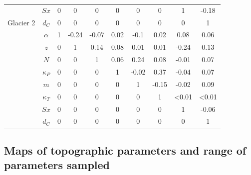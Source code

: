 \documentclass[12pt]{article}
\begin{document}
\begin{table}[]
\begin{tabular}{cccccccccc}
 & $Sx$ & 0 & 0 & 0 & 0 & 0 & 0 & 1 & -0.18 \\
\multirow{-8}{*}{Glacier 2} & $d_C$ & 0 & 0 & 0 & 0 & 0 & 0 & 0 & 1 \\
\rowcolor[HTML]{EFEFEF} 
\cellcolor[HTML]{EFEFEF} & $\alpha$ & 1 & -0.24 & -0.07 & 0.02 & -0.1 & 0.02 & 0.08 & 0.06 \\
\rowcolor[HTML]{EFEFEF} 
\cellcolor[HTML]{EFEFEF} & $z$ & 0 & 1 & 0.14 & 0.08 & 0.01 & 0.01 & -0.24 & 0.13 \\
\rowcolor[HTML]{EFEFEF} 
\cellcolor[HTML]{EFEFEF} & $N$ & 0 & 0 & 1 & 0.06 & 0.24 & 0.08 & -0.01 & 0.07 \\
\rowcolor[HTML]{EFEFEF} 
\cellcolor[HTML]{EFEFEF} & $\kappa_P$ & 0 & 0 & 0 & 1 & -0.02 & 0.37 & -0.04 & 0.07 \\
\rowcolor[HTML]{EFEFEF} 
\cellcolor[HTML]{EFEFEF} & $m$ & 0 & 0 & 0 & 0 & 1 & -0.15 & -0.02 & 0.09 \\
\rowcolor[HTML]{EFEFEF} 
\cellcolor[HTML]{EFEFEF} & \textbf{$\kappa_T$} & 0 & 0 & 0 & 0 & 0 & 1 &\textless 0.01 & \textless 0.01 \\
\rowcolor[HTML]{EFEFEF} 
\cellcolor[HTML]{EFEFEF} & \textbf{$Sx$} & 0 & 0 & 0 & 0 & 0 & 0 & 1 & -0.06 \\
\rowcolor[HTML]{EFEFEF} 
\multirow{-8}{*}{\cellcolor[HTML]{EFEFEF}Glacier 13} & \textbf{$d_C$} & 0 & 0 & 0 & 0 & 0 & 0 & 0 & 1
\end{tabular}
\end{table}

\subsection{Maps of topographic parameters and range of parameters sampled}
\end{document}
